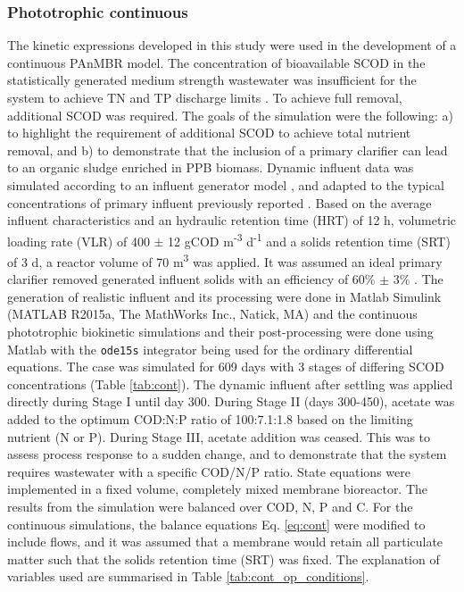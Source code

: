 \subsubsection{Phototrophic continuous}
The kinetic expressions developed in this study were used in the development of a continuous PAnMBR model. The concentration of bioavailable SCOD in the statistically generated medium strength wastewater \cite{gernaey2011} was insufficient for the system to achieve TN and TP discharge limits \cite{hulsen2016}. To achieve full removal, additional SCOD was required. The goals of the simulation were the following: a) to highlight the requirement of additional SCOD to achieve total nutrient removal, and b) to demonstrate that the inclusion of a primary clarifier can lead to an organic sludge enriched in PPB biomass. Dynamic influent data was simulated according to an influent generator model \cite{gernaey2011}, and adapted to the typical concentrations of primary influent previously reported \cite{hulsen2014}. Based on the average influent characteristics and an hydraulic retention time (HRT) of 12 h, volumetric loading rate (VLR) of 400 $\pm$ 12 gCOD m\textsuperscript{-3} d\textsuperscript{-1} and a solids retention time (SRT) of 3 d, a reactor volume of 70 m\textsuperscript{3} was applied. It was assumed an ideal primary clarifier removed generated influent solids with an efficiency of 60\% $\pm$ 3\% \cite{tchobanoglous1991}. The generation of realistic influent and its processing were done in Matlab Simulink (MATLAB R2015a, The MathWorks Inc., Natick, MA) and the continuous phototrophic biokinetic simulations and their post-processing were done using Matlab with the \texttt{ode15s} integrator being used for the ordinary differential equations. 
\skippingparagraph
The case was simulated for 609 days with 3 stages of differing SCOD concentrations (Table \ref{tab:cont}). The dynamic influent after settling was applied directly during Stage I until day 300. During Stage II (days 300-450), acetate was added to the optimum COD:N:P ratio of 100:7.1:1.8 based on the limiting nutrient (N or P). During Stage III, acetate addition was ceased. This was to assess process response to a sudden change, and to demonstrate that the system requires wastewater with a specific COD/N/P ratio. State equations were implemented in a fixed volume, completely mixed membrane bioreactor. The results from the simulation were balanced over COD, N, P and C. For the continuous simulations, the balance equations Eq. \eqref{eq:cont} were modified to include flows, and it was assumed that a membrane would retain all particulate matter such that the solids retention time (SRT) was fixed. The explanation of variables used are summarised in Table \ref{tab:cont_op_conditions}. 

